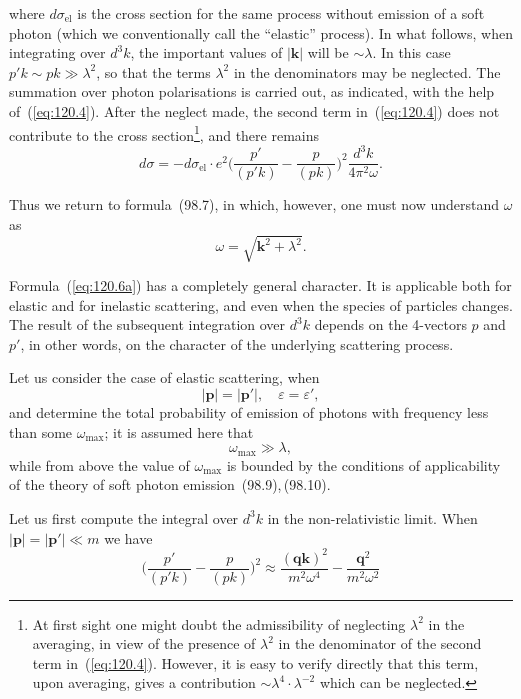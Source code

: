 \noindent where $d\sigma_{\text{el}}$ is the cross section for the same process without emission of a soft photon (which we conventionally call the ``elastic'' process). In what follows, when integrating over $d^3 k$, the important values of $|\mathbf{k}|$ will be $\sim \lambda$. In this case $p'k \sim pk \gg \lambda^2$, so that the terms $\lambda^2$ in the denominators may be neglected. The summation over photon polarisations is carried out, as indicated, with the help of~(\ref{eq:120.4}). After the neglect made, the second term in~(\ref{eq:120.4}) does not contribute to the cross section\footnote{At first sight one might doubt the admissibility of neglecting $\lambda^2$ in the averaging, in view of the presence of $\lambda^2$ in the denominator of the second term in~(\ref{eq:120.4}). However, it is easy to verify directly that this term, upon averaging, gives a contribution $\sim \lambda^4 \cdot \lambda^{-2}$ which can be neglected.}, and there remains
\begin{equation}
d\sigma = -d\sigma_{\text{el}} \cdot e^2 \biggl(\frac{p'}{(p'k)} - \frac{p}{(pk)}\biggr)^2 \frac{d^3 k}{4\pi^2 \omega}.
\label{eq:120.6a}
\end{equation}

Thus we return to formula~(98.7), in which, however, one must now understand $\omega$ as
\begin{equation}
\omega = \sqrt{\mathbf{k}^2 + \lambda^2}.
\label{eq:120.7}
\end{equation}

Formula~(\ref{eq:120.6a}) has a completely general character. It is applicable both for elastic and for inelastic scattering, and even when the species of particles changes. The result of the subsequent integration over $d^3 k$ depends on the 4-vectors $p$ and $p'$, in other words, on the character of the underlying scattering process.

Let us consider the case of elastic scattering, when
\[
|\mathbf{p}| = |\mathbf{p}'|, \quad \varepsilon = \varepsilon',
\]
and determine the total probability of emission of photons with frequency less than some $\omega_{\max}$; it is assumed here that
\begin{equation}
\omega_{\max} \gg \lambda,
\label{eq:120.8}
\end{equation}
while from above the value of $\omega_{\max}$ is bounded by the conditions of applicability of the theory of soft photon emission~(98.9),\,(98.10).

Let us first compute the integral over $d^3 k$ in the non-relativistic limit. When $|\mathbf{p}| = |\mathbf{p}'| \ll m$ we have
\[
\biggl(\frac{p'}{(p'k)} - \frac{p}{(pk)}\biggr)^2 \approx \frac{(\mathbf{q}\mathbf{k})^2}{m^2\omega^4} - \frac{\mathbf{q}^2}{m^2\omega^2}
\]

